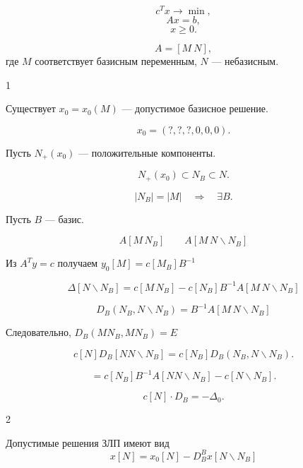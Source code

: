 \documentclass[12pt,a4paper]{article}
\begin{document}
\[
c^Tx\to\min,
\]
\[
Ax=b,
\]
\[
x\geq0.
\]

\[
A=[M\ N],
\]
где $M$ соответствует базисным переменным, $N$ --- небазисным.

\begin{theorem}{1}

Существует $x_0=x_0(M)$ --- допустимое базисное решение.

\[
x_0=(?, ?, ?, 0,0,0).
\]

Пусть $N_+(x_0)$ --- положительные компоненты.

\[
N_+(x_0)\subset N_B\subset N.
\]

\[
|N_B|=|M|
\quad\Longrightarrow\quad
\exists B.
\]

\end{theorem}

\begin{proofbox}{}

Пусть $B$ --- базис.

\[
A[M\,N_B]
\qquad
A[M\,N \backslash N_B]
\]

Из $A^Ty=c$ получаем $y_0[M]=c[M_B]B^{-1}$

\[
\Delta[N\backslash N_B]
=
c[M\,N_B]
-c[N_B]B^{-1}A[M\,N \backslash N_B]
\]

\[
D_B(N_B,N\backslash N_B)
=
B^{-1}A[M\,N\backslash N_B]
\]

Следовательно, $D_B(MN_B, MN_B)=E$

\[
c[N]D_B[N N \backslash N_B]
=
c[N_B]D_B(N_B,N \backslash N_B).
\]

\[
=
c[N_B]B^{-1}A[N N \backslash N_B]-c[N\backslash N_B].
\]

\[
c[N]\cdot D_B=-\Delta_0.
\]

\end{proofbox}

\begin{theorem}{2}

Допустимые решения ЗЛП имеют вид
\[
x[N]
=
x_0[N]-D_B^B x[N \backslash N_B]
\]

\end{theorem}
\end{document}
